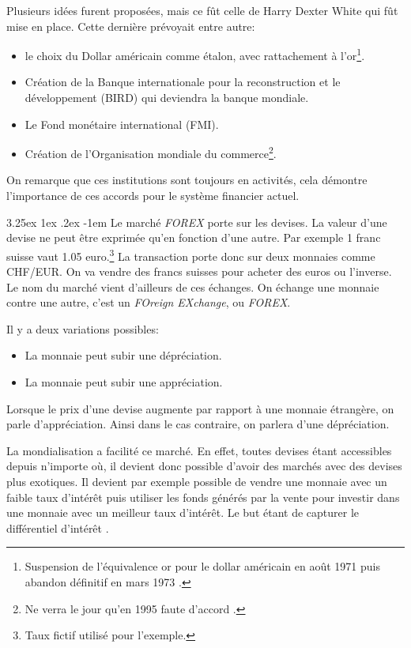 \documentclass[a4paper, 11pt]{article}
\makeatletter
\renewcommand\paragraph{\@startsection{paragraph}{5}{\z@}%
  {3.25ex \@plus1ex \@minus.2ex}%
  {-1em}%
  {\normalfont\normalsize\bfseries}}
\makeatother
\begin{document}
Plusieurs idées furent proposées, mais ce fût celle de Harry Dexter White qui fût mise en place. Cette dernière prévoyait entre autre:
\begin{itemize}
\item le choix du Dollar américain comme étalon, avec rattachement à l'or\footnote{Suspension de l'équivalence or pour le dollar américain en août 1971 puis abandon 
définitif en mars 1973 \cite{wikipedia_bretten_woods}.}.
\item Création de la Banque internationale pour la reconstruction et le développement (BIRD) qui deviendra la banque mondiale.
\item Le Fond monétaire international (FMI).
\item Création de l'Organisation mondiale du commerce\footnote{Ne verra le jour qu'en 1995 faute d'accord \cite{wikipedia_bretten_woods}.}.
\end{itemize}

On remarque que ces institutions sont toujours en activités, 
cela démontre l'importance de ces accords pour le système financier actuel.

\paragraph{}
Le marché \textit{FOREX} porte sur les devises. La valeur d'une devise ne peut être exprimée qu'en fonction d'une autre. 
Par exemple 1 franc suisse vaut 1.05 euro.\footnote{Taux fictif utilisé pour l'exemple.}
La transaction porte donc sur deux monnaies comme CHF/EUR. On va vendre des francs suisses pour acheter des euros ou l'inverse.
Le nom du marché vient d'ailleurs de ces échanges. 
On échange une monnaie contre une autre, c'est un \textit{FOreign EXchange}, ou \textit{FOREX}.

Il y a deux variations possibles:
\begin{itemize}
\item La monnaie peut subir une dépréciation.
\item La monnaie peut subir une appréciation.
\end{itemize}
Lorsque le prix d'une devise augmente par rapport à une monnaie étrangère, on parle d'appréciation. 
Ainsi dans le cas contraire, on parlera d'une dépréciation.

La mondialisation a facilité ce marché. En effet, toutes devises étant accessibles depuis 
n'importe où, il devient donc possible d'avoir des marchés avec des devises plus exotiques.
Il devient par exemple possible de vendre une monnaie avec un faible taux d'intérêt puis utiliser les fonds générés par la vente pour investir dans une monnaie avec un meilleur taux d'intérêt. Le but étant de capturer le différentiel d'intérêt \cite{currency_carry_trade}.
\end{document}
